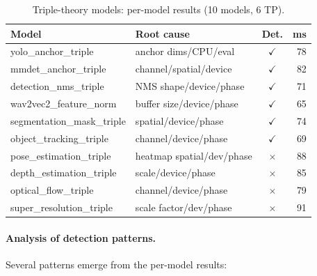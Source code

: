 \documentclass[10pt]{article}
\theoremstyle{plain}
\theoremstyle{definition}
\theoremstyle{remark}
\begin{document}
\begin{table}[t]
\centering
\caption{Triple-theory models: per-model results (10 models, 6 TP).}
\label{tab:per-model-triple}
\small
\begin{tabular}{@{}llcr@{}}
\toprule
\textbf{Model} & \textbf{Root cause} & \textbf{Det.} & \textbf{ms} \\
\midrule
yolo\_anchor\_triple         & anchor dims/CPU/eval      & $\checkmark$ & 78 \\
mmdet\_anchor\_triple        & channel/spatial/device    & $\checkmark$ & 82 \\
detection\_nms\_triple       & NMS shape/device/phase    & $\checkmark$ & 71 \\
wav2vec2\_feature\_norm      & buffer size/device/phase  & $\checkmark$ & 65 \\
segmentation\_mask\_triple   & spatial/device/phase      & $\checkmark$ & 74 \\
object\_tracking\_triple     & channel/device/phase      & $\checkmark$ & 69 \\
pose\_estimation\_triple     & heatmap spatial/dev/phase & $\times$     & 88 \\
depth\_estimation\_triple    & scale/device/phase        & $\times$     & 85 \\
optical\_flow\_triple        & channel/device/phase      & $\times$     & 79 \\
super\_resolution\_triple    & scale factor/dev/phase    & $\times$     & 91 \\
\bottomrule
\end{tabular}
\end{table}

\paragraph{Analysis of detection patterns.}
Several patterns emerge from the per-model results:
\end{document}
